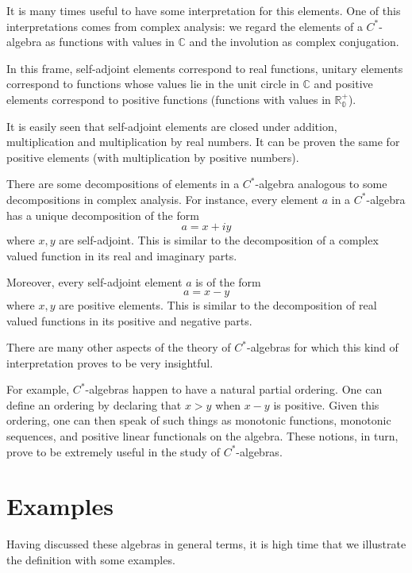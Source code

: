 \documentclass[12pt]{article}
\theoremstyle{inlinedefn}
\theoremstyle{break}
\begin{document}
It is many times useful to have some interpretation for this elements. One of this interpretations comes from complex analysis: we regard the elements of a $C^*$-algebra as functions with values in $\mathbb{C}$ and the involution as complex conjugation. 

In this frame, self-adjoint elements correspond to real functions, unitary elements correspond to functions whose values lie in the unit circle in $\mathbb{C}$ and positive elements correspond to positive functions (functions with values in $\mathbb{R^+_0}$).

It is easily seen that self-adjoint elements are closed under addition, multiplication and multiplication by real numbers. It can be proven the same for positive elements (with multiplication by positive numbers).

There are some decompositions of elements in a $C^*$-algebra analogous to some decompositions in complex analysis. For instance, every element $a$ in a $C^*$-algebra has a unique decomposition of the form
\begin{displaymath}
a = x + i y
\end{displaymath}
where $x, y$ are self-adjoint. This is similar to the decomposition of a complex valued function in its real and imaginary parts.

Moreover, every self-adjoint element $a$ is of the form
\begin{displaymath}
a = x - y
\end{displaymath}
where $x, y$ are positive elements. This is similar to the decomposition of real valued functions in its positive and negative parts.

There are many other aspects of the theory of $C^*$-algebras for which this kind of interpretation proves to be very insightful.
 
For example, $C^*$-algebras happen to have a natural partial ordering. One can define an
ordering by declaring that $x > y$ when $x - y$ is positive. Given this ordering, one can then
speak of such things as monotonic functions, monotonic sequences, 
and positive linear functionals on the algebra.  These notions, in
turn, prove to be extremely useful in the study of $C^*$-algebras.  

\section{Examples}

Having discussed these algebras in general terms, it is high time
that we illustrate the definition with some examples.
\end{document}

